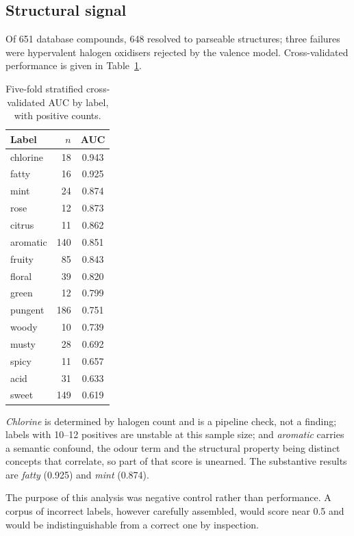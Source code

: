 \documentclass[
  computerscience
]{genesisl1-paper}
\begin{document}
\subsection{Structural signal}

Of 651 database compounds, 648 resolved to parseable structures; three failures were
hypervalent halogen oxidisers rejected by the valence model. Cross-validated performance
is given in Table~\ref{tab:auc}.

\begin{table}[t]
\caption{Five-fold stratified cross-validated AUC by label, with positive counts.}
\label{tab:auc}
\centering
\begin{tabular}{lrc}
\hline
Label & $n$ & AUC \\
\hline
chlorine  &  18 & 0.943 \\
fatty     &  16 & 0.925 \\
mint      &  24 & 0.874 \\
rose      &  12 & 0.873 \\
citrus    &  11 & 0.862 \\
aromatic  & 140 & 0.851 \\
fruity    &  85 & 0.843 \\
floral    &  39 & 0.820 \\
green     &  12 & 0.799 \\
pungent   & 186 & 0.751 \\
woody     &  10 & 0.739 \\
musty     &  28 & 0.692 \\
spicy     &  11 & 0.657 \\
acid      &  31 & 0.633 \\
sweet     & 149 & 0.619 \\
\hline
\end{tabular}
\end{table}

\begin{GenesisEvidence}
\emph{Chlorine} is determined by halogen count and is a pipeline check, not a finding;
labels with 10--12 positives are unstable at this sample size; and \emph{aromatic}
carries a semantic confound, the odour term and the structural property being distinct
concepts that correlate, so part of that score is unearned. The substantive results are
\emph{fatty} (0.925) and \emph{mint} (0.874).
\end{GenesisEvidence}

The purpose of this analysis was negative control rather than performance. A corpus of
incorrect labels, however carefully assembled, would score near 0.5 and would be
indistinguishable from a correct one by inspection.
\end{document}
